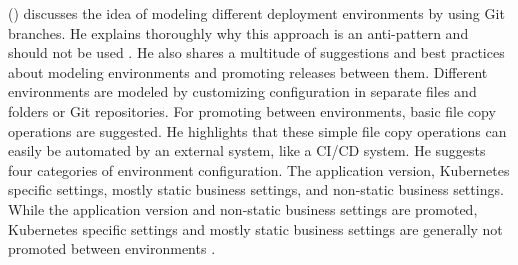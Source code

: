 \citeauthor{codefreshStopUsingBranchesGitOpsEnvironments} (\citeyear{codefreshStopUsingBranchesGitOpsEnvironments})
discusses
the idea of
modeling different deployment environments by using Git branches.
He
explains thoroughly why this approach is an anti-pattern and should not be used
\autocite{codefreshStopUsingBranchesGitOpsEnvironments}.
He
also shares
a multitude of suggestions and best practices
about modeling environments and promoting releases between them.
Different environments are modeled by customizing configuration in separate files and folders or Git repositories.
For promoting between environments, basic file copy operations are suggested.
He highlights that these simple file copy operations can easily be automated by an external system,
like a CI/CD system.
He
suggests four categories of environment configuration.
The application version,
Kubernetes specific settings,
mostly static business settings,
and 
non-static business settings.
While the application version and non-static business settings are promoted,
Kubernetes specific settings and mostly static business settings are generally not promoted between environments
\autocite{codefreshHowToModelGitOpsEnvironmentsAndPromote}.




